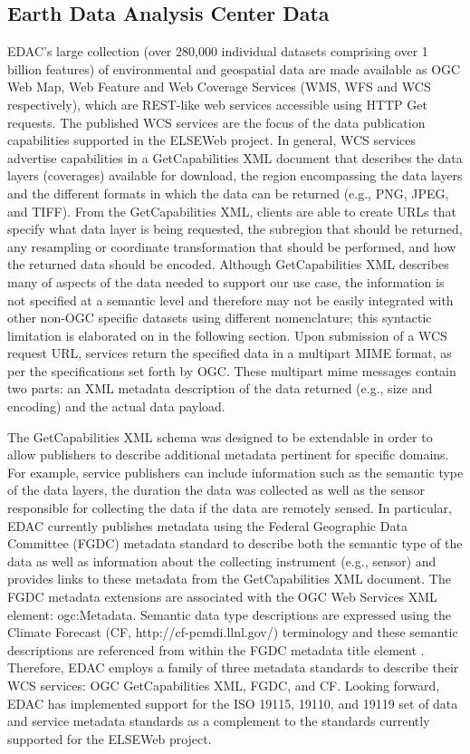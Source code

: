 \documentclass[letterpaper]{article}
\begin{document}
\subsection{Earth Data Analysis Center Data}
EDAC's large collection (over 280,000 individual datasets comprising over 1 billion features) of environmental and geospatial data are made available as OGC Web Map, Web Feature and Web Coverage Services (WMS, WFS and WCS respectively), which are REST-like web services accessible using HTTP Get requests. The published WCS services are the focus of the data publication capabilities supported in the ELSEWeb project. In general, WCS services advertise capabilities in a GetCapabilities XML document that describes the data layers (coverages) available for download, the region encompassing the data layers and the different formats in which the data can be returned (e.g., PNG, JPEG, and TIFF). From the GetCapabilities XML, clients are able to create URLs that specify what data layer is being requested, the subregion that should be returned, any resampling or coordinate transformation that should be performed, and how the returned data should be encoded. Although GetCapabilities XML describes many of aspects of the data needed to support our use case, the information is not specified at a semantic level and therefore may not be easily integrated with other non-OGC specific datasets using different nomenclature; this syntactic limitation is elaborated on in the following section. Upon submission of a WCS request URL, services return the specified data in a multipart MIME format, as per the specifications set forth by OGC. These multipart mime messages contain two parts: an XML metadata description of the data returned (e.g., size and encoding) and the actual data payload.
 
The GetCapabilities XML schema was designed to be extendable in order to allow publishers to describe additional metadata pertinent for specific domains. For example, service publishers can include information such as the semantic type of the data layers, the duration the data was collected as well as the sensor responsible for collecting the data if the data are remotely sensed. In particular, EDAC currently publishes metadata using the Federal Geographic Data Committee (FGDC) \cite{federal1998fgdc} metadata standard to describe both the semantic type of the data as well as information about the collecting instrument (e.g., sensor) and provides links to these metadata from the GetCapabilities XML document. The FGDC metadata extensions are associated with the OGC Web Services XML element: ogc:Metadata. Semantic data type descriptions are expressed using the Climate Forecast (CF, http://cf-pcmdi.llnl.gov/) terminology and these semantic descriptions are referenced from within the FGDC metadata title element \cite{eaton2003netcdf}. Therefore, EDAC employs a family of three metadata standards to describe their WCS services: OGC GetCapabilities XML, FGDC, and CF. Looking forward, EDAC has implemented support for the ISO 19115, 19110, and 19119 set of data and service metadata standards as a complement to the standards currently supported for the ELSEWeb project. 
\end{document}
